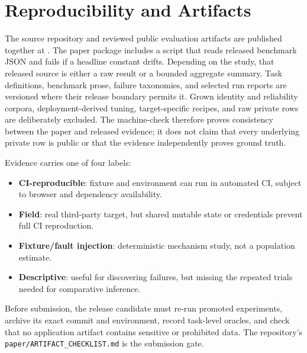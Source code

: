 \section{Reproducibility and Artifacts}

The source repository and reviewed public evaluation artifacts are published
together \cite{openadaptartifact} at \artifacturl{}. The paper package includes
a script that reads released benchmark JSON and fails if a headline constant
drifts. Depending on the study, that released source is either a raw result or a
bounded aggregate summary. Task definitions, benchmark prose, failure
taxonomies, and selected run reports are versioned where their release boundary
permits it. Grown identity and reliability corpora, deployment-derived tuning,
target-specific recipes, and raw private rows are deliberately excluded. The
machine-check therefore proves consistency between the paper and released
evidence; it does not claim that every underlying private row is public or that
the evidence independently proves ground truth.

Evidence carries one of four labels:
\begin{itemize}
  \item \textbf{CI-reproducible}: fixture and environment can run in automated
        CI, subject to browser and dependency availability.
  \item \textbf{Field}: real third-party target, but shared mutable state or
        credentials prevent full CI reproduction.
  \item \textbf{Fixture/fault injection}: deterministic mechanism study, not a
        population estimate.
  \item \textbf{Descriptive}: useful for discovering failures, but missing the
        repeated trials needed for comparative inference.
\end{itemize}

Before submission, the release candidate must re-run promoted experiments,
archive its exact commit and environment, record task-level oracles, and check
that no application artifact contains sensitive or prohibited data. The
repository's \texttt{paper/ARTIFACT\_CHECKLIST.md} is the submission gate.

